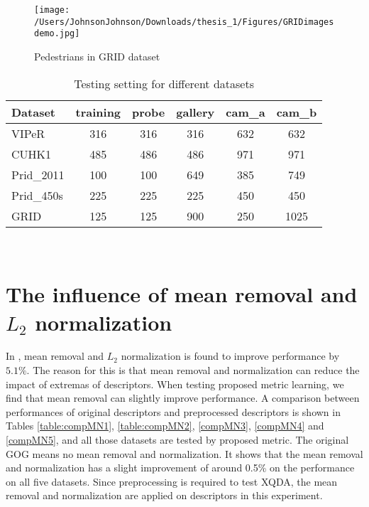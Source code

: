 \begin{figure}[H]
\begin{raggedleft}
\texttt{[image: /Users/JohnsonJohnson/Downloads/thesis\_1/Figures/GRIDimagesdemo.jpg]}
\vspace{-3em}
\caption{Pedestrians in GRID dataset}
\end{raggedleft}
\end{figure}
\begin{table}[H]
\centering
\caption{Testing setting for different datasets}
\label{Settings}
\begin{tabular}{|l|c|c|c|c|c|}
\hline
Dataset&training&probe&gallery&cam\_a&cam\_b\\
\hline
VIPeR&316&316&316&632&632\\
\hline
CUHK1&485&486&486&971&971\\
\hline
Prid\_2011&100&100&649&385&749\\
\hline
Prid\_450s&225&225&225&450&450\\
\hline
GRID&125&125&900&250&1025\\
\hline
\end{tabular}\\ 
\end{table}
\section{The influence of mean removal and $L_2$ normalization}
In \cite{GOG}, mean removal and $L_2$  normalization is found to improve performance by $5.1\%$. The reason for this is that mean removal and normalization can reduce the impact of extremas of descriptors. When testing proposed metric learning, we find that mean removal can slightly improve performance. A comparison between performances of original descriptors and preprocessed descriptors is shown in Tables \ref{table:compMN1}, \ref{table:compMN2}, \ref{compMN3}, \ref{compMN4} and \ref{compMN5}, and all those datasets are tested by proposed metric. The original GOG means no mean removal and normalization. It shows that the mean removal and normalization has a slight improvement of around 0.5\% on the performance on all five datasets. Since preprocessing is required to test XQDA, the mean removal and normalization are applied on descriptors in this experiment. 

